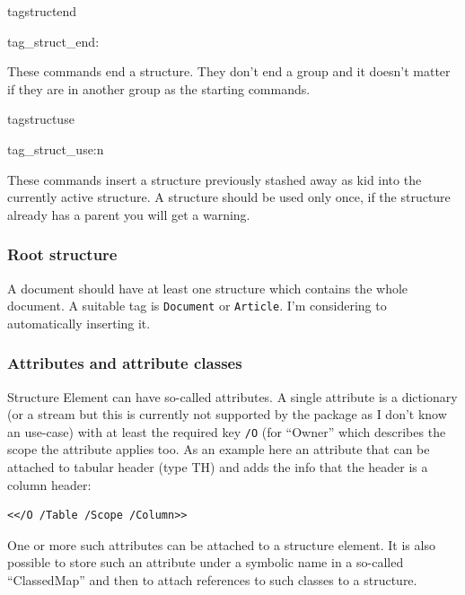 \documentclass[DIV=12,parskip=half-,bibliography=totoc]{scrartcl}
\begin{document}
\begin{docCommand}{tagstructend}{}\end{docCommand}
\begin{docCommand}{tag_struct_end:}{}\end{docCommand}

These commands end a structure. They don't end a group and it doesn't matter if they are in another group as the starting commands.

\begin{docCommand}{tagstructuse}{}\end{docCommand}
\begin{docCommand}{tag_struct_use:n}{}\end{docCommand}


These commands insert a structure previously stashed away as kid into the currently active structure. A structure should be used only once, if the structure already has a parent you will get a warning.



\subsubsection{Root structure}



A document should have at least one structure which contains the whole document. A suitable tag is \texttt{Document} or \texttt{Article}. I'm considering to automatically inserting it.




\subsubsection{Attributes and attribute classes}\label{sec:attributes}


Structure Element can have so-called attributes. A single attribute is a dictionary%
(or a stream but this is currently not supported by the package as I don't know an use-case)
with at least the required key \verb+/O+ (for \enquote{Owner} which describes the scope the attribute applies too.
As an example here an attribute that can be attached to tabular header (type TH) and adds the info that the header is a column header:

\begin{lstlisting}
<</O /Table /Scope /Column>>
\end{lstlisting}

One or more such attributes can be attached to a structure element. It is also possible to store such an attribute under a symbolic name in a so-called \enquote{ClassedMap} and then to attach references to such classes to a structure.
\end{document}
